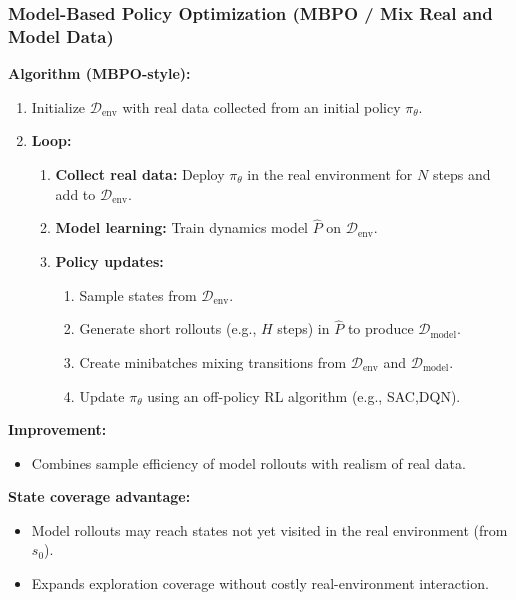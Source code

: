 \documentclass[12pt]{article}
\begin{document}
\subsubsection{Model-Based Policy Optimization (MBPO / Mix Real and Model Data)}
\textbf{Algorithm (MBPO-style):}
\begin{enumerate}
    \item Initialize $\mathcal{D}_{\text{env}}$ with real data collected from an initial policy $\pi_\theta$.
    \item \textbf{Loop:}
    \begin{enumerate}
        \item \textbf{Collect real data:} Deploy $\pi_\theta$ in the real environment for $N$ steps and add to $\mathcal{D}_{\text{env}}$.
        \item \textbf{Model learning:} Train dynamics model $\hat{P}$ on $\mathcal{D}_{\text{env}}$.
        \item \textbf{Policy updates:}
        \begin{enumerate}
            \item Sample states from $\mathcal{D}_{\text{env}}$.
            \item Generate short rollouts (e.g., $H$ steps) in $\hat{P}$ to produce $\mathcal{D}_{\text{model}}$.
            \item Create minibatches mixing transitions from $\mathcal{D}_{\text{env}}$ and $\mathcal{D}_{\text{model}}$.
            \item Update $\pi_\theta$ using an off-policy RL algorithm (e.g., SAC,DQN).
        \end{enumerate}
    \end{enumerate}
\end{enumerate}


\textbf{Improvement:}
\begin{itemize}
    \item Combines sample efficiency of model rollouts with realism of real data.
\end{itemize}

\item \textbf{State coverage advantage:}
\begin{itemize}
    \item Model rollouts may reach states not yet visited in the real environment (from $s_0$).
    \item Expands exploration coverage without costly real-environment interaction.
\end{itemize}
\end{document}
